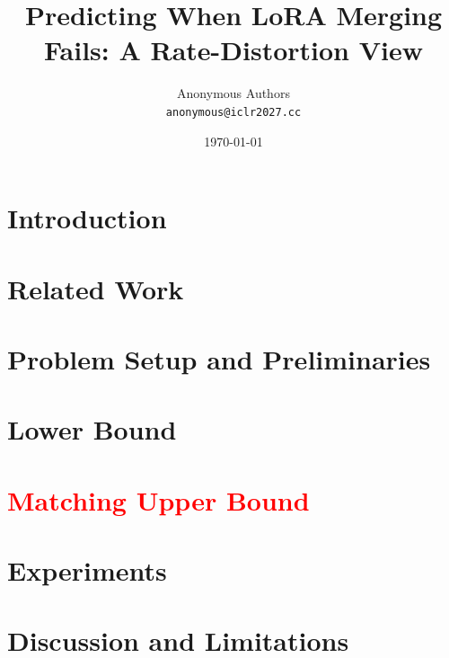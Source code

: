 \documentclass{article}
\title{Predicting When LoRA Merging Fails: A Rate-Distortion View}
\author{Anonymous Authors\\
  \texttt{anonymous@iclr2027.cc}}
\date{\today}
\newcommand{\new}[1]{\textcolor{red}{#1}}
\theoremstyle{definition}
\theoremstyle{remark}
\begin{document}
\maketitle

\begin{abstract}

\end{abstract}

\section{Introduction}


\section{Related Work}


\section{Problem Setup and Preliminaries}\label{sec:setup}


\section{Lower Bound}\label{sec:lower}


\section{\new{Matching Upper Bound}}\label{sec:achv}


\section{Experiments}\label{sec:exp}


\section{Discussion and Limitations}\label{sec:discussion}




\end{document}
